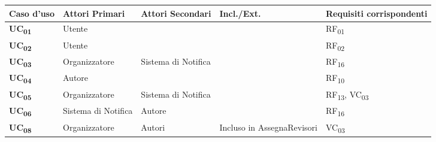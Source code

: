 \begin{tabular}{|p{2cm}|p{2cm}|p{2cm}|p{2cm}|p{2cm}|}
  \hline
  \rowcolor{SkyBlue}
  Caso d'uso & Attori Primari & Attori Secondari & Incl./Ext. & Requisiti corrispondenti \\
  \hline
  \hline
  \textbf{UC\textsubscript{01}}& Utente & & & RF\textsubscript{01} \\
  \hline
  \textbf{UC\textsubscript{02}} & Utente & & & RF\textsubscript{02} \\
  \hline
  \textbf{UC\textsubscript{03}} & Organizzatore & Sistema di Notifica & & RF\textsubscript{16} \\
  \hline
  \textbf{UC\textsubscript{04}} & Autore & & & RF\textsubscript{10} \\
  \hline
  \textbf{UC\textsubscript{05}} & Organizzatore & Sistema di Notifica&  & RF\textsubscript{13}, VC\textsubscript{03} \\
  \hline
  \textbf{UC\textsubscript{06}} & Sistema di Notifica & Autore & & RF\textsubscript{16}\\
  \hline
  \textbf{UC\textsubscript{08}} & Organizzatore & Autori & Incluso in AssegnaRevisori & VC\textsubscript{03} \\
  \hline
\end{tabular}
